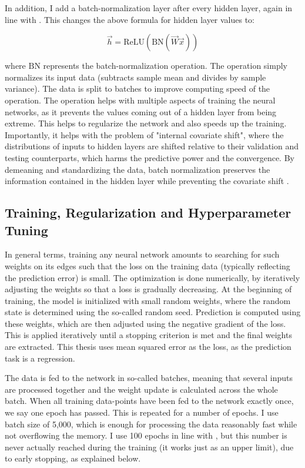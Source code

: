 	In addition, I add a batch-normalization layer \citep{ioffe2015batch} after every hidden layer, again in line with  \cite{gu2020empirical}. This changes the above formula for hidden layer values to: 
	
	\begin{equation}
		\vec{h} = \text{ReLU}(\text{BN}(\vec{W}\vec{x}))
	\end{equation}
	
	where $\text{BN}$ represents the batch-normalization operation. The operation simply normalizes its input data (subtracts sample mean and divides by sample variance). The data is split to batches to improve computing speed of the operation. The operation helps with multiple aspects of training the neural networks, as it prevents the values coming out of a hidden layer from being extreme. This helps to regularize the network and also speeds up the training. Importantly, it helps with the problem of "internal covariate shift", where the distributions of inputs to hidden layers are shifted relative to their validation and testing counterparts, which harms the predictive power and the convergence. By demeaning and standardizing the data, batch normalization preserves the information contained in the hidden layer while preventing the covariate shift \citep{ioffe2015batch}. 
	
	
	\subsection{Training, Regularization and Hyperparameter Tuning}
	
	In general terms, training any neural network amounts to searching for such weights on its edges such that the loss on the training data (typically reflecting the prediction error) is small. The optimization is done numerically, by iteratively adjusting the weights so that a loss is gradually decreasing. At the beginning of training, the model is initialized with small random weights, where the random state is determined using the so-called random seed. Prediction is computed using these weights, which are then adjusted using the negative gradient of the loss. This is applied iteratively until a stopping criterion is met and the final weights are extracted. This thesis uses mean squared error as the loss, as the prediction task is a regression.
	
	The data is fed to the network in so-called batches, meaning that several inputs are processed together and the weight update is calculated across the whole batch. When all training data-points have been fed to the network exactly once, we say one epoch has passed. This is repeated for a number of epochs. I use batch size of 5,000, which is enough for processing the data reasonably fast while not overflowing the memory. I use 100 epochs in line with \cite{gu2020empirical}, but this number is never actually reached during the training (it works just as an upper limit), due to early stopping, as explained below.
	
